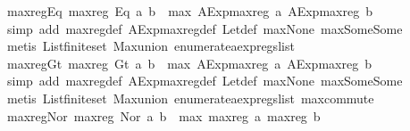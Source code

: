 \begin{isabellebody}
\isanewline
%
\endisadelimproof
\isanewline
{}\isamarkupfalse%
\ max{\isacharunderscore}reg{\isacharunderscore}Eq{\isacharcolon}\ {\isachardoublequoteopen}max{\isacharunderscore}reg\ {\isacharparenleft}Eq\ a\ b{\isacharparenright}\ {\isacharequal}\ max\ {\isacharparenleft}AExp{\isachardot}max{\isacharunderscore}reg\ a{\isacharparenright}\ {\isacharparenleft}AExp{\isachardot}max{\isacharunderscore}reg\ b{\isacharparenright}{\isachardoublequoteclose}\isanewline
%
\isadelimproof
\ \ %
\endisadelimproof
%
\isatagproof
{}\isamarkupfalse%
\ {\isacharparenleft}simp\ add{\isacharcolon}\ max{\isacharunderscore}reg{\isacharunderscore}def\ AExp{\isachardot}max{\isacharunderscore}reg{\isacharunderscore}def\ Let{\isacharunderscore}def\ max{\isacharunderscore}None\ max{\isacharunderscore}Some{\isacharunderscore}Some{\isacharparenright}\isanewline
\ \ \isamarkupfalse%
\ {\isacharparenleft}metis\ List{\isachardot}finite{\isacharunderscore}set\ Max{\isachardot}union\ enumerate{\isacharunderscore}aexp{\isacharunderscore}regs{\isacharunderscore}list{\isacharparenright}%
\endisatagproof
{\isafoldproof}%
%
\isadelimproof
\isanewline
%
\endisadelimproof
\isanewline
{}\isamarkupfalse%
\ max{\isacharunderscore}reg{\isacharunderscore}Gt{\isacharcolon}\ {\isachardoublequoteopen}max{\isacharunderscore}reg\ {\isacharparenleft}Gt\ a\ b{\isacharparenright}\ {\isacharequal}\ max\ {\isacharparenleft}AExp{\isachardot}max{\isacharunderscore}reg\ a{\isacharparenright}\ {\isacharparenleft}AExp{\isachardot}max{\isacharunderscore}reg\ b{\isacharparenright}{\isachardoublequoteclose}\isanewline
%
\isadelimproof
\ \ %
\endisadelimproof
%
\isatagproof
{}\isamarkupfalse%
\ {\isacharparenleft}simp\ add{\isacharcolon}\ max{\isacharunderscore}reg{\isacharunderscore}def\ AExp{\isachardot}max{\isacharunderscore}reg{\isacharunderscore}def\ Let{\isacharunderscore}def\ max{\isacharunderscore}None\ max{\isacharunderscore}Some{\isacharunderscore}Some{\isacharparenright}\isanewline
\ \ \isamarkupfalse%
\ {\isacharparenleft}metis\ List{\isachardot}finite{\isacharunderscore}set\ Max{\isachardot}union\ enumerate{\isacharunderscore}aexp{\isacharunderscore}regs{\isacharunderscore}list\ max{\isachardot}commute{\isacharparenright}%
\endisatagproof
{\isafoldproof}%
%
\isadelimproof
\isanewline
%
\endisadelimproof
\isanewline
{}\isamarkupfalse%
\ max{\isacharunderscore}reg{\isacharunderscore}Nor{\isacharcolon}\ {\isachardoublequoteopen}max{\isacharunderscore}reg\ {\isacharparenleft}Nor\ a\ b{\isacharparenright}\ {\isacharequal}\ max\ {\isacharparenleft}max{\isacharunderscore}reg\ a{\isacharparenright}\ {\isacharparenleft}max{\isacharunderscore}reg\ b{\isacharparenright}{\isachardoublequoteclose}\isanewline

\end{isabellebody}
